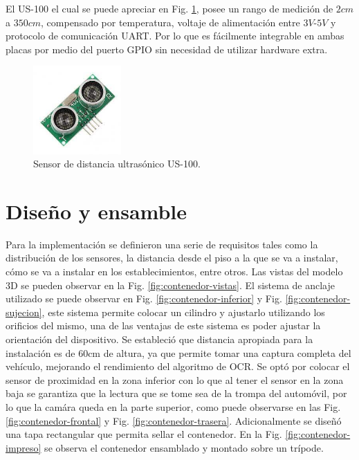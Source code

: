 El US-100 el cual se puede apreciar en Fig. \ref{fig:sensor-US100}, posee un rango de medición de $2cm$ a $350cm$, compensado por temperatura, voltaje de alimentación entre $3V$-$5V$ y protocolo de comunicación UART.
Por lo que es fácilmente integrable en ambas placas por medio del puerto GPIO sin necesidad de utilizar hardware extra.
\begin{figure}[bth]
    \centering
    \includegraphics[width=0.3\textwidth]{imgs/us-100.jpg}
    \caption{Sensor de distancia ultrasónico US-100.}
    \label{fig:sensor-US100}
\end{figure}

\section{Diseño y ensamble}
Para la implementación se definieron una serie de requisitos tales como la distribución de los sensores, la distancia desde el piso a la que se va a instalar, cómo se va a instalar en los establecimientos, entre otros. Las vistas del modelo 3D se pueden observar en la Fig. \ref{fig:contenedor-vistas}.
El sistema de anclaje utilizado se puede observar en Fig. \ref{fig:contenedor-inferior} y Fig. \ref{fig:contenedor-sujecion}, este sistema permite colocar un cilindro y ajustarlo utilizando los orificios del mismo, una de las ventajas de este sistema es poder ajustar la orientación del dispositivo.
Se estableció que distancia apropiada para la instalación es de 60cm de altura, ya que permite tomar una captura completa del vehículo, mejorando el rendimiento del algoritmo de OCR.
Se optó por colocar el sensor de proximidad en la zona inferior con lo que al tener el sensor en la zona baja se garantiza que la lectura que se tome sea de la trompa del automóvil, por lo que la camára queda en la parte superior, como puede observarse en las Fig. \ref{fig:contenedor-frontal} y Fig. \ref{fig:contenedor-trasera}.
Adicionalmente se diseñó una tapa rectangular que permita sellar el contenedor. En la Fig. \ref{fig:contenedor-impreso} se observa el contenedor ensamblado y montado sobre un trípode.

